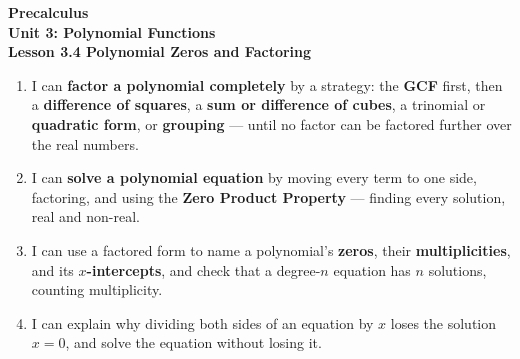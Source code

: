 \documentclass[10pt]{article}
\begin{document}
\vspace{-0.8in}

\begin{center}
  {\color{white}\textbf{\LARGE Precalculus}}\\[4pt]
  {\color{lilacmid}\large\textbf{Unit 3: Polynomial Functions}}\\[6pt]
  {\color{white}\textbf{\large Lesson 3.4 \quad Polynomial Zeros and Factoring}}
\end{center}

\vspace{0.3in}
\namedateperiod
\vspace{0.18in}

\begin{learningtargetbox}
\small
\begin{enumerate}[leftmargin=1.5em, itemsep=5pt]
  \item I can \textbf{factor a polynomial completely} by a strategy: the \textbf{GCF} first,
        then a \textbf{difference of squares}, a \textbf{sum or difference of cubes}, a
        trinomial or \textbf{quadratic form}, or \textbf{grouping} --- until no factor can be
        factored further over the real numbers.
  \item I can \textbf{solve a polynomial equation} by moving every term to one side,
        factoring, and using the \textbf{Zero Product Property} --- finding every solution,
        real and non-real.
  \item I can use a factored form to name a polynomial's \textbf{zeros}, their
        \textbf{multiplicities}, and its \textbf{$x$-intercepts}, and check that a degree-$n$
        equation has $n$ solutions, counting multiplicity.
  \item I can explain why dividing both sides of an equation by $x$ loses the solution
        $x = 0$, and solve the equation without losing it.
\end{enumerate}
\end{learningtargetbox}

\vspace{0.14in}
\end{document}
